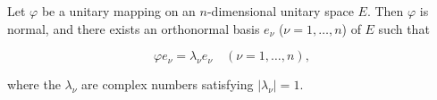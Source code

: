 Let $\varphi$ be a unitary mapping on an $n$-dimensional unitary space $E$. Then $\varphi$ is normal, and there exists an orthonormal basis $e_\nu$ ($\nu = 1, \ldots, n$) of $E$ such that

$$\varphi e_\nu = \lambda_\nu e_\nu \quad (\nu = 1, \ldots, n),$$

where the $\lambda_\nu$ are complex numbers satisfying $|\lambda_\nu| = 1$.

